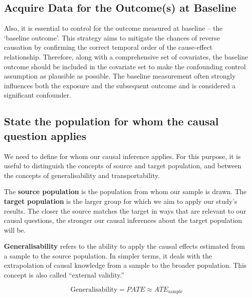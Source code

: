 \documentclass[
  singlecolumn]{report}
\begin{document}
\hypertarget{acquire-data-for-the-outcomes-at-baseline}{%
\subsection{\texorpdfstring{\textbf{Acquire Data for the Outcome(s) at
Baseline}}{Acquire Data for the Outcome(s) at Baseline}}\label{acquire-data-for-the-outcomes-at-baseline}}

Also, it is essential to control for the outcome measured at baseline --
the `baseline outcome'. This strategy aims to mitigate the chances of
reverse causation by confirming the correct temporal order of the
cause-effect relationship. Therefore, along with a comprehensive set of
covariates, the baseline outcome should be included in the covariate set
to make the confounding control assumption as plausible as possible. The
baseline measurement often strongly influences both the exposure and the
subsequent outcome and is considered a significant confounder.

\hypertarget{state-the-population-for-whom-the-causal-question-applies}{%
\subsection{\texorpdfstring{\textbf{State the population for whom the
causal question
applies}}{State the population for whom the causal question applies}}\label{state-the-population-for-whom-the-causal-question-applies}}

We need to define for whom our causal inference applies. For this
purpose, it is useful to distinguish the concepts of source and target
population, and between the concepts of generalisability and
transportability.

The \textbf{source population} is the population from whom our sample is
drawn. The \textbf{target population} is the larger group for which we
aim to apply our study's results. The closer the source matches the
target in ways that are relevant to our causal questions, the stronger
our causal inferences about the target population will be.

\textbf{Generalisability} refers to the ability to apply the causal
effects estimated from a sample to the source population. In simpler
terms, it deals with the extrapolation of causal knowledge from a sample
to the broader population. This concept is also called ``external
validity.''

\[\text{Generalisability} = PATE \approx ATE_{\text{sample}}\]
\end{document}
